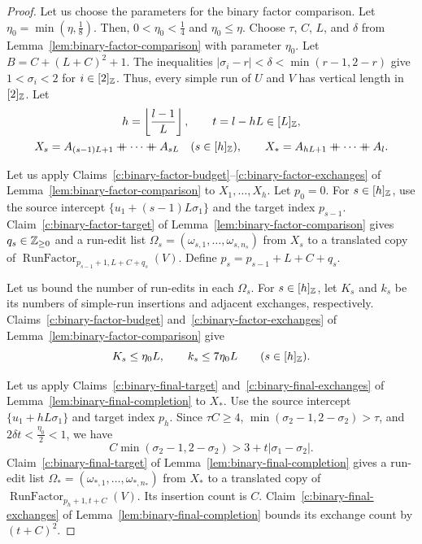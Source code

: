 \begin{proof}
 Let us choose the parameters for the binary factor comparison.
Let $\eta_0=\min(\eta,\frac18)$. Then, $0<\eta_0<\frac14$ and $\eta_0\le\eta$.
Choose $\tau$, $C$, $L$, and $\delta$ from Lemma~\ref{lem:binary-factor-comparison} with parameter $\eta_0$. Let
$B=C+(L+C)^2+1$.
The inequalities $|\sigma_i-r|<\delta<\min(r-1,2-r)$ give $1<\sigma_i<2$ for $i\in[2]_{\mathbb Z}$.
Thus, every simple run of $U$ and $V$ has vertical length in $[2]_{\mathbb Z}$.
Let
\[
\begin{gathered}
 h=\floor{\frac{l-1}{L}},\qquad t=l-hL\in[L]_{\Z},\\
 X_s=A_{(s-1)L+1}\ccn \cdots\ccn A_{sL}\quad(s\in[h]_{\Z}),\qquad X_*=A_{hL+1}\ccn \cdots\ccn A_l.
\end{gathered}
\]

Let us apply Claims~\ref{c:binary-factor-budget}--\ref{c:binary-factor-exchanges} of Lemma~\ref{lem:binary-factor-comparison} to $X_1,\ldots,X_h$.
Let $p_0=0$.
For $s\in[h]_{\mathbb Z}$, use the source intercept $\{u_1+(s-1)L\sigma_1\}$ and the target index $p_{s-1}$.
Claim~\ref{c:binary-factor-target} of Lemma~\ref{lem:binary-factor-comparison} gives $q_s\in\mathbb Z_{\ge0}$ and a run-edit list
$\Omega_s=(\omega_{s,1},\ldots,\omega_{s,n_s})$ from $X_s$ to a translated copy of
$\operatorname{RunFactor}_{p_{s-1}+1,L+C+q_s}(V)$.
Define $p_s=p_{s-1}+L+C+q_s$.

Let us bound the number of run-edits in each $\Omega_s$.
For $s\in[h]_{\mathbb Z}$, let $K_s$ and $k_s$ be its numbers of simple-run insertions and adjacent exchanges, respectively.
Claims~\ref{c:binary-factor-budget} and~\ref{c:binary-factor-exchanges} of Lemma~\ref{lem:binary-factor-comparison} give
\[
 K_s\le\eta_0L,\qquad k_s\le7\eta_0L\qquad(s\in[h]_{\mathbb Z}).
\]

Let us apply Claims~\ref{c:binary-final-target} and~\ref{c:binary-final-exchanges} of Lemma~\ref{lem:binary-final-completion} to $X_*$.
Use the source intercept $\{u_1+hL\sigma_1\}$ and target index $p_h$.
Since $\tau C\ge4$, $\min(\sigma_2-1,2-\sigma_2)>\tau$, and $2\delta t<\frac{\eta_0}2<1$, we have
\[
 C\min(\sigma_2-1,2-\sigma_2)>3+t|\sigma_1-\sigma_2|.
\]
Claim~\ref{c:binary-final-target} of Lemma~\ref{lem:binary-final-completion} gives a run-edit list $\Omega_*=(\omega_{*,1},\ldots,\omega_{*,n_*})$ from $X_*$
to a translated copy of $\operatorname{RunFactor}_{p_h+1,t+C}(V)$.
Its insertion count is $C$. Claim~\ref{c:binary-final-exchanges} of Lemma~\ref{lem:binary-final-completion} bounds its exchange count by $(t+C)^2$.


\end{proof}
